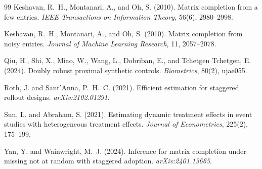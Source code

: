\documentclass[11pt]{article}
\theoremstyle{definition}
\theoremstyle{plain}
\theoremstyle{remark}
\begin{document}
\begin{thebibliography}{99}
Keshavan, R.~H., Montanari, A., and Oh, S. (2010).
Matrix completion from a few entries.
\emph{IEEE Transactions on Information Theory}, 56(6), 2980--2998.

Keshavan, R.~H., Montanari, A., and Oh, S. (2010).
Matrix completion from noisy entries.
\emph{Journal of Machine Learning Research}, 11, 2057--2078.

Qiu, H., Shi, X., Miao, W., Wang, L., Dobriban, E., and Tchetgen Tchetgen, E. (2024).
Doubly robust proximal synthetic controls.
\emph{Biometrics}, 80(2), ujae055.

Roth, J. and Sant'Anna, P.~H.~C. (2021).
Efficient estimation for staggered rollout designs.
\emph{arXiv:2102.01291}.

Sun, L. and Abraham, S. (2021).
Estimating dynamic treatment effects in event studies with heterogeneous treatment effects.
\emph{Journal of Econometrics}, 225(2), 175--199.

Yan, Y. and Wainwright, M.~J. (2024).
Inference for matrix completion under missing not at random with staggered adoption.
\emph{arXiv:2401.13665}.
\end{thebibliography}
\end{document}
